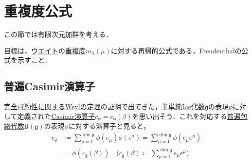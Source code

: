 \documentclass[rep_main]{subfiles}
\begin{document}
\section{重複度公式}
この節では有限次元加群を考える．
目標は，\hyperref[def:weight-rep]{ウエイト}の\hyperref[def:mutiplicity]{重複度}$m_\lambda(\mu)$に対する再帰的公式である，Freudenthalの公式を示すこと．

\subsection{普遍Casimir演算子}
\hyperref[thm:Weyl]{完全可約性に関するWeylの定理}の証明で出てきた，\hyperref[def:semisimple-LieAlg]{半単純Lie代数}$\mathfrak{g}$の表現$\phi$に対して定義された\hyperref[def:Casimir]{Casimir演算子}$c_\phi = c_\phi(\beta)$を思い出そう．これを対応する\hyperref[def:univ-env-alg]{普遍包絡代数}$\mathfrak{U}(\mathfrak{g})$の表現$\phi$に対する演算子と見ると，
\begin{align}
	c_\phi &\coloneqq \sum_{\mu=1}^{\dim\mathfrak{g}} \phi(e_\mu)\phi(e^\mu) = \sum_{\mu=1}^{\dim\mathfrak{g}} \phi(e_\mu e^\mu) \\
	\label{eq:univ-Casimir-beta}
	&= \phi(c_\mathfrak{g}(\beta))\quad  \biggl(c_\mathfrak{g}(\beta) \coloneqq \sum_{\mu=1}^{\dim\mathfrak{g}} e_\mu e^\mu \biggr)
\end{align}
\end{document}
